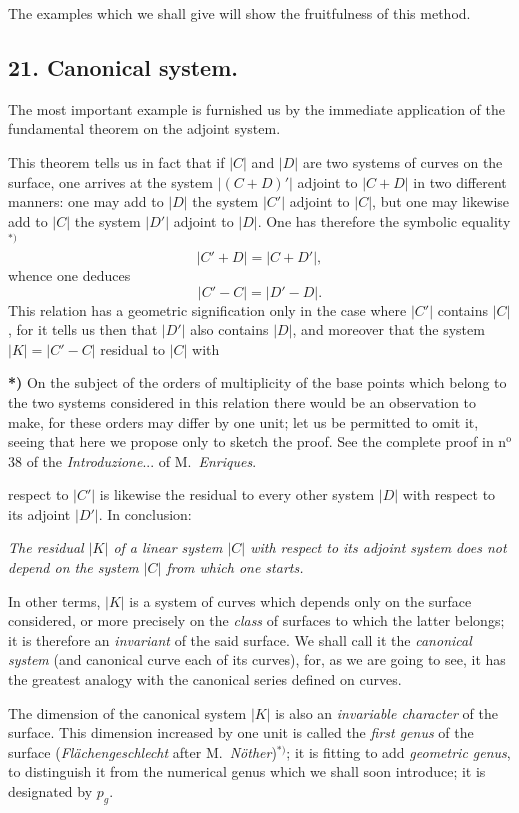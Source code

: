\documentclass{article}
\begin{document}
The examples which we shall give will show the fruitfulness of this method.

\subsection*{21. Canonical system.}

The most important example is furnished us by the immediate application of the fundamental theorem on the adjoint system.

This theorem tells us in fact that if $|C|$ and $|D|$ are two systems of curves on the surface, one arrives at the system $|(C+D)'|$ adjoint to $|C+D|$ in two different manners: one may add to $|D|$ the system $|C'|$ adjoint to $|C|$, but one may likewise add to $|C|$ the system $|D'|$ adjoint to $|D|$. One has therefore the symbolic equality${}^{*)}$
\[ |C'+D| = |C+D'|, \]
whence one deduces
\[ |C'-C| = |D'-D|. \]
This relation has a geometric signification only in the case where $|C'|$ contains $|C|$, for it tells us then that $|D'|$ also contains $|D|$, and moreover that the system $|K| = |C'-C|$ residual to $|C|$ with

\textbf{*)} On the subject of the orders of multiplicity of the base points which belong to the two systems considered in this relation there would be an observation to make, for these orders may differ by one unit; let us be permitted to omit it, seeing that here we propose only to sketch the proof. See the complete proof in n${}^{\text{o}}$ 38 of the \emph{Introduzione}... of M.\ \emph{Enriques}.

respect to $|C'|$ is likewise the residual to every other system $|D|$ with respect to its adjoint $|D'|$. In conclusion:

\emph{The residual $|K|$ of a linear system $|C|$ with respect to its adjoint system does not depend on the system $|C|$ from which one starts.}

In other terms, $|K|$ is a system of curves which depends only on the surface considered, or more precisely on the \emph{class} of surfaces to which the latter belongs; it is therefore an \emph{invariant} of the said surface. We shall call it the \emph{canonical system} (and canonical curve each of its curves), for, as we are going to see, it has the greatest analogy with the canonical series defined on curves.

The dimension of the canonical system $|K|$ is also an \emph{invariable character} of the surface. This dimension increased by one unit is called the \emph{first genus} of the surface (\emph{Flächengeschlecht} after M.\ \emph{Nöther})${}^{*)}$; it is fitting to add \emph{geometric genus}, to distinguish it from the numerical genus which we shall soon introduce; it is designated by $p_{g}$.
\end{document}
